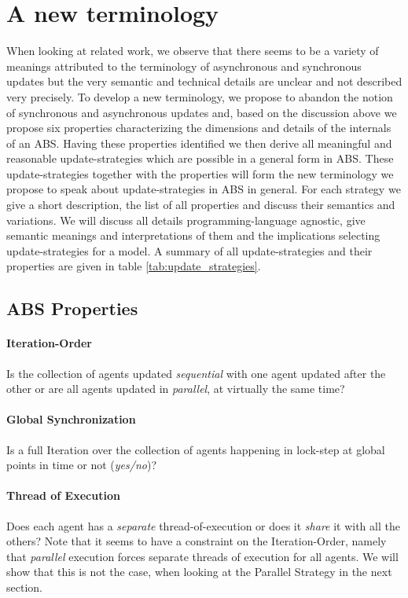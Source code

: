 \section{A new terminology}
When looking at related work, we observe that there seems to be a variety of meanings attributed to the terminology of asynchronous and synchronous updates but the very semantic and technical details are unclear and not described very precisely. To develop a new terminology, we propose to abandon the notion of synchronous and asynchronous updates and, based on the discussion above we propose six properties characterizing the dimensions and details of the internals of an ABS. Having these properties identified we then derive all meaningful and reasonable update-strategies which are possible in a general form in ABS. These update-strategies together with the properties will form the new terminology we propose to speak about update-strategies in ABS in general. For each strategy we give a short description, the list of all properties and discuss their semantics and variations. We will discuss all details programming-language agnostic, give semantic meanings and interpretations of them and the implications selecting update-strategies for a model. A summary of all update-strategies and their properties are given in table \ref{tab:update_strategies}.

\subsection{ABS Properties}

\paragraph{Iteration-Order}
Is the collection of agents updated \textit{sequential} with one agent updated after the other or are all agents updated in \textit{parallel}, at virtually the same time?

\paragraph{Global Synchronization}
Is a full Iteration over the collection of agents happening in lock-step at global points in time or not (\textit{yes/no})?

\paragraph{Thread of Execution}
Does each agent has a \textit{separate} thread-of-execution or does it \textit{share} it with all the others? Note that it seems to have a constraint on the Iteration-Order, namely that \textit{parallel} execution forces separate threads of execution for all agents. We will show that this is not the case, when looking at the Parallel Strategy in the next section.

